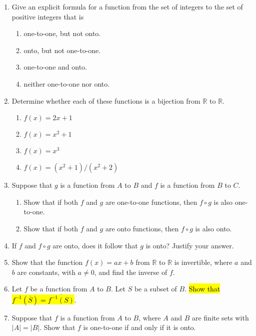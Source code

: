 \documentclass{../../cls/sig-alternate-05-2015}
\begin{document}
\begin{enumerate}
\item Give an explicit formula for a function from the set of
integers to the set of positive integers that is
    \begin{enumerate}
    \item one-to-one, but not onto.
    \item onto, but not one-to-one.
    \item one-to-one and onto.
    \item neither one-to-one nor onto.
    \end{enumerate}

\item Determine whether each of these functions is a bijection
from $\mathbb{R}$ to $\mathbb{R}$.
    \begin{enumerate}
        \item $f(x)=2x+1$
        \item $f(x)=x^2+1$
        \item $f(x)=x^3$
        \item $f(x)=(x^2+1)/(x^2+2)$
    \end{enumerate}

\item 
Suppose that $g$ is a function from $A$ to $B$ and $f$ is a
function from $B$ to $C$.
    \begin{enumerate}
        \item Show that if both $f$ and $g$ are one-to-one functions,
        then $f\circ g$ is also one-to-one.
        
        \item Show that if both $f$ and $g$ are onto functions, then
        $f \circ  g$ is also onto.
    \end{enumerate}
    
\item If $f$ and $f \circ g$ are onto, does it follow that $g$ is onto?
Justify your answer.

\item Show that the function $f (x) = ax + b$ from  $\mathbb{R}$ to  $\mathbb{R}$ is
invertible, where $a$ and $b$ are constants, with $a\neq 0$, and
find the inverse of $f$.

\item Let $f$ be a function from $A$ to $B$. Let $S$ be a subset of $B$.
\hl{Show that $f^{-1}(\overline{S})=\overline{f^{-1}(S)}$}.

\item Suppose that $f$ is a function from $A$ to $B$, where $A$ and $B$
are finite sets with $|A| = |B|$. Show that $f$ is one-to-one
if and only if it is onto.


\end{enumerate}
\end{document}
